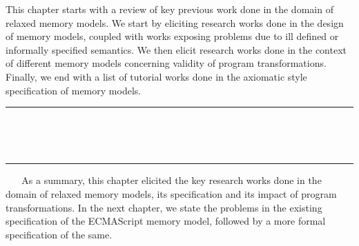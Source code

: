 This chapter starts with a review of key previous work done in the domain of relaxed memory models.
We start by eliciting research works done in the design of memory models, coupled with works exposing problems due to ill defined or informally specified semantics. 
We then elicit research works done in the context of different memory models concerning validity of program transformations. 
Finally, we end with a list of tutorial works done in the axiomatic style specification of memory models.
\ \newline
\ \newline  
\hrule 
\ \newline 
\ \newline 






  

   
  

\ \newline
\ \newline  
\hrule 
\ \newline 
\ \newline 
As a summary, this chapter elicited the key research works done in the domain of relaxed memory models, its specification and its impact of program transformations. 
In the next chapter, we state the problems in the existing specification of the ECMAScript memory model, followed by a more formal specification of the same.